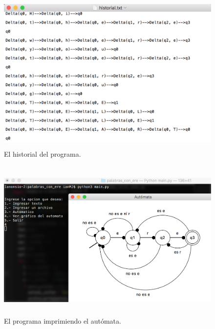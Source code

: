 \documentclass[12pt]{article}
\begin{document}
\begin{figure}[H]
\includegraphics[width=\textwidth, height=8cm]{palabras_ere_historial}
\caption{El historial del programa.}
\label{fig:automata_ere_auto}
\end{figure}

\begin{figure}[H]
\includegraphics[width=\textwidth, height=8cm]{automata_prueba}
\caption{El programa imprimiendo el autómata.}
\label{fig:automata_ere_prueba}
\end{figure}

\end{document}
